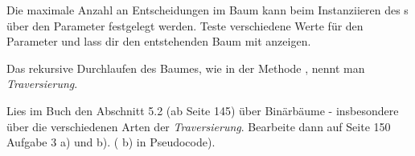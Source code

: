 \documentclass[10pt, a4paper]{scrartcl}
\begin{document}
\begin{aufgabe}[symbol=\symLaptop]
	Die maximale Anzahl an Entscheidungen im Baum kann beim Instanziieren des s über den Parameter  festgelegt werden. Teste verschiedene Werte für den Parameter und lass dir den entstehenden Baum mit  anzeigen.
\end{aufgabe}

\begin{aufgabe}[symbol=\symBuch]
	Das rekursive Durchlaufen des Baumes, wie in der Methode , nennt man \emph{Traversierung}.
	
	Lies im Buch den Abschnitt 5.2 (ab Seite 145) über Binärbäume - insbesondere über die verschiedenen Arten der \emph{Traversierung}. Bearbeite dann auf Seite 150 Aufgabe 3 a) und b). ( b) in Pseudocode).
\end{aufgabe}
\end{document}
